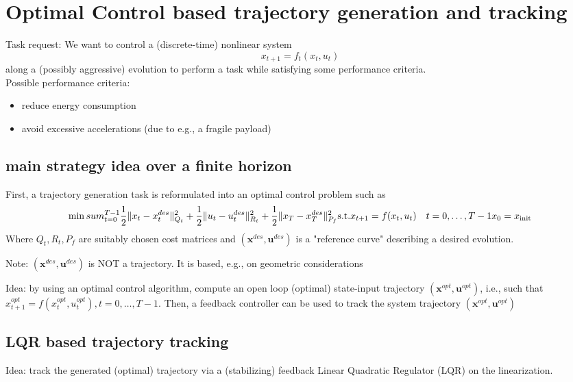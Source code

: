 \documentclass{book}
\theoremstyle{definition}
\theoremstyle{remark}
\theoremstyle{remark}
\begin{document}
\chapter{Optimal Control based trajectory generation and tracking}
Task request: We want to control a (discrete-time) nonlinear system 
\[
    x_{t+1}=f_t(x_t,u_t)
\]
along a (possibly aggressive) evolution to perform a task while satisfying some performance criteria.
\\Possible performance criteria:
\begin{itemize}
    \item reduce energy consumption
    \item avoid excessive accelerations (due to e.g., a fragile payload)
\end{itemize}
\section{main strategy idea over a finite horizon} 
First, a trajectory generation task is reformulated into an optimal control problem such as 
\[
    \min \\sum_{t=0}^{T-1} \displaystyle\frac{1}{2} \| x_t-x_t^{des}\|_{Q_t}^2+ \displaystyle\frac{1}{2}\|u_t-u_t^{des}\|^2_{R_t}+\displaystyle\frac{1}{2}\|x_T-x_T^{des}\|^2_{P_f} \\
    \text{s.t.} x_{t+1} = f(x_t,u_t) \quad t=0,\dots,T-1\\
    x_0 = x_{\text{init}}
\]
Where $Q_t,R_t,P_f$ are suitably chosen cost matrices and $(\mathbf{x}^{des},\mathbf{u}^{des})

$ is a "reference curve" describing a desired evolution. 

Note: $(\mathbf{x}^{des},\mathbf{u}^{des})$ is NOT a trajectory. It is based, e.g., on geometric considerations

Idea: by using an optimal control algorithm, compute an open loop (optimal) state-input trajectory $(\mathbf{x}^{opt},\mathbf{u}^{opt})$, i.e., such that $x_{t+1}^{opt}=f(x_t^{opt},u_t^{opt}),  t=0,\dots,T-1$. Then, a feedback controller can be used to track the system trajectory $(\mathbf{x}^{opt},\mathbf{u}^{opt})$


\section{LQR based trajectory tracking}
Idea: track the generated (optimal) trajectory via a (stabilizing) feedback Linear Quadratic Regulator (LQR) on the linearization.
\end{document}
